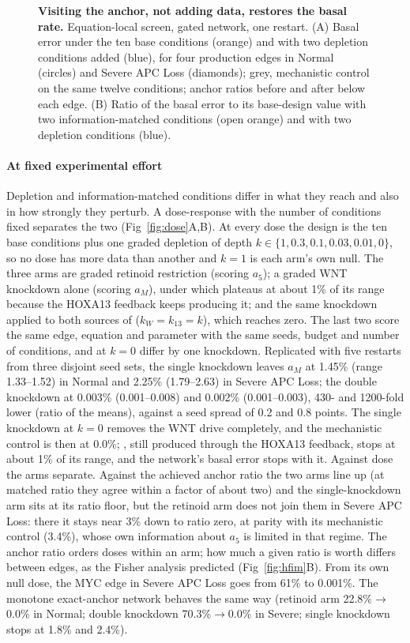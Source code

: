 \begin{figure}[tbp]
\centering
{}
\caption{\textbf{Visiting the anchor, not adding data, restores the basal rate.}
Equation-local screen, gated network, one restart. (A) Basal error under the
ten base conditions (orange) and with two depletion conditions added (blue),
for four production edges in Normal (circles) and Severe APC Loss (diamonds);
grey, mechanistic control on the same twelve conditions; anchor ratios before
and after below each edge. (B) Ratio of the basal error to its base-design value
with two information-matched conditions (open orange) and with two depletion
conditions (blue).}
\label{fig:depletion}
\end{figure}

\paragraph{At fixed experimental effort} Depletion and information-matched
conditions differ in what they reach and also in how strongly they perturb. A
dose-response with the number of conditions fixed separates the two
(Fig~\ref{fig:dose}A,B). At every dose the design is the ten base conditions
plus one graded depletion of depth $k\in\{1,0.3,0.1,0.03,0.01,0\}$, so no dose
has more data than another and $k=1$ is each arm's own null. The three arms are
graded retinoid restriction (scoring $a_5$); a graded WNT knockdown alone
(scoring $a_M$), under which \bcat{} plateaus at about 1\% of its range because the
HOXA13 feedback keeps producing it; and the same knockdown applied to both
sources of \bcat{} ($k_W=k_{13}=k$), which reaches zero. The last two score the
same edge, equation and parameter with the same seeds, budget and number of
conditions, and at $k=0$ differ by one knockdown. Replicated with five restarts
from three disjoint seed sets, the single knockdown leaves $a_M$ at 1.45\%
(range 1.33--1.52) in Normal and 2.25\% (1.79--2.63) in Severe APC Loss; the
double knockdown at 0.003\% (0.001--0.008) and 0.002\% (0.001--0.003), 430- and
1200-fold lower (ratio of the means), against a seed spread of 0.2 and 0.8 points. The single
knockdown at $k=0$ removes the WNT drive completely, and the mechanistic control
is then at 0.0\%; \bcat{}, still produced through the HOXA13 feedback, stops at
about 1\% of its range, and the network's basal error stops with it. Against dose the arms separate. Against the
achieved anchor ratio the two \bcat{} arms line up (at matched ratio they agree
within a factor of about two) and the single-knockdown arm sits at its ratio
floor, but the retinoid arm does not join them in Severe APC Loss: there it
stays near 3\% down to ratio zero, at parity with its mechanistic control (3.4\%),
whose own information about $a_5$ is limited in that regime. The anchor ratio
orders doses within an arm; how much a given ratio is worth differs between
edges, as the Fisher analysis predicted (Fig~\ref{fig:hfim}B). From its own null
dose, the MYC edge in Severe APC Loss goes from 61\% to 0.001\%. The monotone
exact-anchor network behaves the same way (retinoid arm 22.8\%$\to$0.0\% in
Normal; double knockdown 70.3\%$\to$0.0\% in Severe; single knockdown stops at
1.8\% and 2.4\%).

